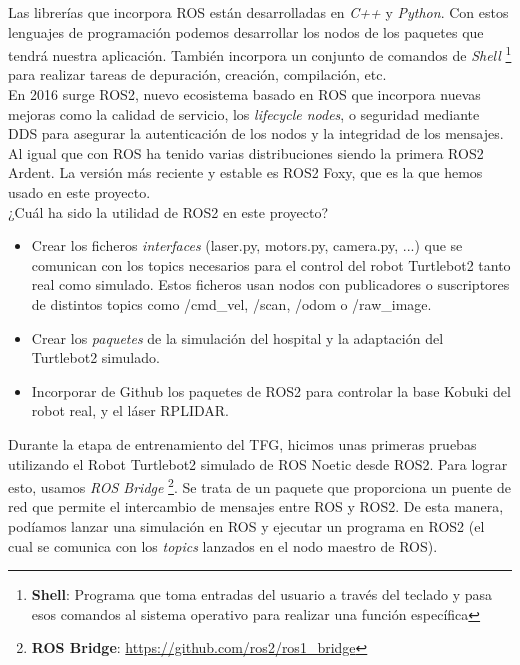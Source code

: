 Las librerías que incorpora ROS están desarrolladas en \textit{C++} y \textit{Python}. Con estos lenguajes de programación podemos desarrollar los nodos de los paquetes que tendrá nuestra aplicación. También incorpora un conjunto de comandos de \textit{Shell} \footnote{\textbf{Shell}: Programa que toma entradas del usuario a través del teclado y pasa esos comandos al sistema operativo para realizar una función específica} para realizar tareas de depuración, creación, compilación, etc.\\

En 2016 surge ROS2, nuevo ecosistema basado en ROS que incorpora nuevas mejoras como la calidad de servicio, los \textit{lifecycle nodes}, o seguridad mediante DDS para asegurar la autenticación de los nodos y la integridad de los mensajes. Al igual que con ROS ha tenido varias distribuciones siendo la primera ROS2 Ardent. La versión más reciente y estable es ROS2 Foxy, que es la que hemos usado en este proyecto.\\

¿Cuál ha sido la utilidad de ROS2 en este proyecto?
\begin{itemize}
	\item Crear los ficheros \textit{interfaces} (laser.py, motors.py, camera.py, ...) que se comunican con los topics necesarios para el control del robot Turtlebot2 tanto real como simulado. Estos ficheros usan nodos con publicadores o suscriptores de distintos topics como /cmd\_vel, /scan, /odom o /raw\_image.
	\item Crear los \textit{paquetes} de la simulación del hospital y la adaptación del Turtlebot2 simulado.
	\item Incorporar de Github los paquetes de ROS2 para controlar la base Kobuki del robot real, y el láser RPLIDAR.
\end{itemize}

Durante la etapa de entrenamiento del TFG, hicimos unas primeras pruebas utilizando el Robot Turtlebot2 simulado de ROS Noetic desde ROS2. Para lograr esto, usamos \textit{ROS Bridge} \footnote{\textbf{ROS Bridge}: \url{https://github.com/ros2/ros1_bridge}}. Se trata de un paquete que proporciona un puente de red que permite el intercambio de mensajes entre ROS y ROS2. De esta manera, podíamos lanzar una simulación en ROS y ejecutar un programa en ROS2 (el cual se comunica con los \textit{topics} lanzados en el nodo maestro de ROS).\\




